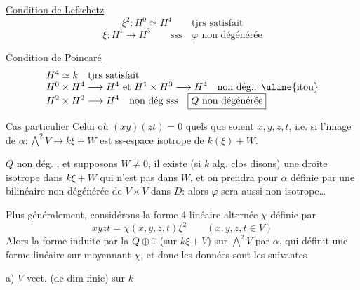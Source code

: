 \uline{Condition de Lefschetz}
\[
\xi^2:H^0\simeq H^4\qquad\text{tjrs satisfait}
\]
\[
\xi:H^1\longrightarrow H^3\qquad\text{sss}\quad
\boxed{\varphi\text{ non dégénérée}}
\]

\uline{Condition de Poincaré}
\[
\begin{array}{l}
H^4\simeq k\quad\text{tjrs satisfait}\\
H^0\times H^4\longrightarrow H^4\text{ et }H^1\times H^3\longrightarrow H^4\quad\text{non dég.: }\uline{\text{itou}}\\
H^2\times H^2\longrightarrow H^4\quad\text{non dég sss}\quad\boxed{Q\text{ non dégénérée}}
\end{array}
\]

\uline{Cas particulier} Celui où $(xy)(zt)=0$ quels que soient $x,y,z,t$, i.e.
\margin{[i.e. $(H^1)H^3=0$ dans $H^4$ !]}
si l'image de $\alpha:\bigwedge^2V\longrightarrow k\xi+W$ est   ss-espace isotrope de $k(\xi)+W$.

$Q$ non dég. , et supposons $W\neq0$, il existe (si $k$  alg. clos disons) une droite isotrope  dans $k\xi+W$ qui n'est pas dans $W$, et on prendra pour $\alpha$  définie par une  bilinéaire  non dégénérée  de $V\times V$ dans $D$: alors $\varphi$ sera aussi non isotrope\ldots


Plus généralement, considérons la forme 4-linéaire alternée $\chi$ définie par
\[
xyzt=\chi(x,y,z,t)\xi^2\qquad(x,y,z,t\in V)
\]
Alors la forme  induite par la  $Q\oplus1$ (sur $k\xi+V$) sur $\bigwedge^2 V$ par $\alpha$, qui définit une  forme linéaire sur
moyennant $\chi$, et donc les données sont les suivantes

a) $V$ vect. (de dim finie) sur $k$

